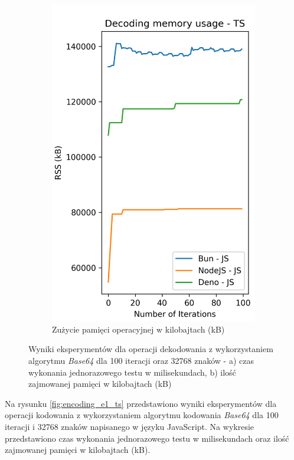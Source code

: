 \begin{figure}[H]
\begin{subfigure}[b]{0.4\textwidth}
    \includegraphics[width=\textwidth]{Figures/coding/base64_100_decoding_js_memory.png}
    \caption{Zużycie pamięci operacyjnej w kilobajtach (kB)}
    \label{fig:decoding_e1_js_memory}
  \end{subfigure}
  \hfill
  \caption{Wyniki eksperymentów dla operacji dekodowania z wykorzystaniem algorytmu \textit{Base64} dla 100 iteracji oraz 32768 znaków - a) czas wykonania jednorazowego testu w milisekundach, b) ilość zajmowanej pamięci w kilobajtach (kB)}
  \label{fig:decoding_e1_js}
\end{figure}

Na rysunku \ref{fig:encoding_e1_ts} przedstawiono wyniki eksperymentów dla operacji kodowania z wykorzystaniem algorytmu kodowania \textit{Base64} dla 100 iteracji i 32768 znaków napisanego w języku JavaScript. Na wykresie przedstawiono czas wykonania jednorazowego testu w milisekundach oraz ilość zajmowanej pamięci w kilobajtach (kB).

